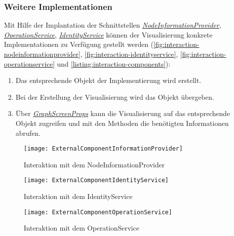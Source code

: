 \subsubsection{Weitere Implementationen}
Mit Hilfe der Implantation der Schnittstellen \hyperref[NodeInformationProvider]{\textit{NodeInformationProvider}},  \hyperref[OperationService]\textit{OperationService},  \hyperref[IdentityService]{\textit{IdentityService}} können der Visualisierung konkrete Implementationen zu Verfügung gestellt werden (\autoref{fig:interaction-nodeinformationprovider}, \autoref{fig:interaction-identityservice}, \autoref{fig:interaction-operationservice} und \autoref{listing:interaction-components}):
\begin{enumerate}
    \item Das entsprechende Objekt der Implementierung wird erstellt.
    \item Bei der Erstellung der Visualisierung wird das Objekt übergeben.
    \item Über \hyperref[GraphScreenProps]{\textit{GraphScreenProps}} kann die Visualisierung auf das entsprechende Objekt zugreifen und mit den Methoden die benötigten Informationen abrufen.
\end{enumerate}

\begin{figure}[htbp]
\centerline{\texttt{[image: ExternalComponentInformationProvider]}}
\caption{Interaktion mit dem NodeInformationProvider}
\label{fig:interaction-nodeinformationprovider}
\end{figure}


\begin{figure}[htbp]
\centerline{\texttt{[image: ExternalComponentIdentityService]}}
\caption{Interaktion mit dem IdentityService}
\label{fig:interaction-identityservice}
\end{figure}


\begin{figure}[htbp]
\centerline{\texttt{[image: ExternalComponentOperationService]}}
\caption{Interaktion mit dem OperationService}
\label{fig:interaction-operationservice}
\end{figure}


